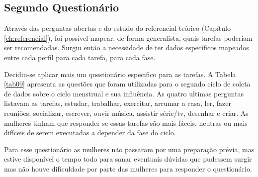\subsection{Segundo Questionário}
Através das perguntas abertas e do estudo do referencial teórico (Capítulo \ref{ch:referencial}), 
foi possível mapear, de forma generalista, quais tarefas poderiam ser 
recomendadas. Surgiu então a necessidade de ter dados específicos mapeados entre cada perfil para cada tarefa, 
para cada fase. 

Decidiu-se aplicar mais um questionário especifico para as tarefas.
A Tabela \ref{tab09} apresenta as questões que foram utilizadas para o segundo ciclo de coleta 
de dados sobre o ciclo menstrual e 
sua influência. As quatro ultimas perguntas listavam as tarefas, estudar, trabalhar, exercitar, arrumar a casa, 
ler, fazer reuniões, socializar, escrever, ouvir música, assistir série/tv, desenhar e criar. As 
mulheres tinham que responder se essas tarefas são mais fáceis, neutras ou mais difíceis de serem executadas 
a depender da fase do ciclo. 

Para esse questionário as mulheres não passaram por uma preparação prévia, mas estive disponível o tempo 
todo para sanar eventuais dúvidas que pudessem surgir mas não houve difículdade por parte das mulheres 
para responder o questionário.

